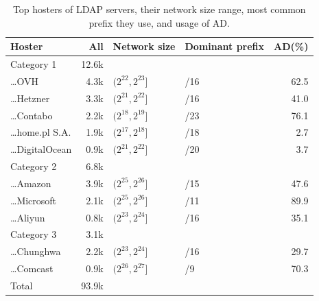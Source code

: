 \begin{table}[tb]
\centering
\scriptsize
\caption{Top hosters of LDAP servers, their network size range, most common prefix they use, and usage of \gls{AD}.}
\begin{tabular}{lrp{1.4cm}p{1.3cm}r}
\toprule
\textbf{Hoster} & \textbf{All} & \textbf{Network size} & \textbf{Dominant prefix} & \textbf{AD(\%)} \\
\midrule
Category 1 & 12.6k & & & \\
\ldots OVH & 4.3k & $(2^{22}, 2^{23}]$ & /16 & 62.5 \\
\ldots Hetzner & 3.3k & $(2^{21}, 2^{22}]$ & /16 & 41.0 \\
\ldots Contabo & 2.2k & $(2^{18}, 2^{19}]$ & /23 & 76.1 \\
\ldots home.pl S.A. & 1.9k & $(2^{17}, 2^{18}]$ & /18 & 2.7 \\
\ldots DigitalOcean & 0.9k & $(2^{21}, 2^{22}]$ & /20 & 3.7 \\
\midrule

Category 2 & 6.8k & & & \\
\ldots Amazon & 3.9k & $(2^{25}, 2^{26}]$ & /15 & 47.6 \\
\ldots Microsoft & 2.1k & $(2^{25}, 2^{26}]$ & /11 & 89.9 \\
\ldots Aliyun & 0.8k & $(2^{23}, 2^{24}]$ & /16 & 35.1 \\
\midrule

Category 3 & 3.1k & & & \\
\ldots Chunghwa & 2.2k & $(2^{23}, 2^{24}]$ & /16 & 29.7 \\
\ldots Comcast & 0.9k & $(2^{26}, 2^{27}]$ & /9 & 70.3 \\

\midrule
Total & 93.9k & & & \\
\bottomrule
\end{tabular}
\vspace{-15px}
\label{tab:hosting}
\end{table}






